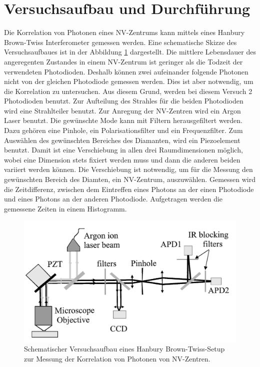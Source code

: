 \section{Versuchsaufbau und Durchf\"uhrung}
Die Korrelation von Photonen eines NV-Zentrums kann mittels eines  Hanbury Brown-Twiss Interferometer
gemessen werden. Eine schematische Skizze des Versuchsaufbaues ist in der Abbildung \ref{fig:Versuchsaufbau} dargestellt. 
Die mittlere Lebensdauer des angeregenten Zustandes in einem NV-Zentrum ist geringer als die Todzeit der verwendeten Photodioden. 
Deshalb k\"onnen zwei aufeinander folgende Photonen nicht von der gleichen Photodiode gemessen werden. 
Dies ist aber notwendig, um die Korrelation zu untersuchen. Aus diesem Grund, werden bei diesem Versuch 2 Photodioden benutzt. 
Zur Aufteilung des Strahles für die beiden Photodioden wird eine Strahlteiler benutzt. Zur Anregung der NV-Zentren wird ein Argon Laser benutzt. 
Die gewünschte Mode kann mit Filtern herausgefiltert werden. Dazu gehören eine Pinhole, ein Polarisationsfilter und ein Frequenzfilter.  
Zum Ausw\"ahlen des gew\"unschten Bereiches des Diamanten, wird ein Piezoelement benutzt. 
Damit ist eine Verschiebung in allen drei Raumdimensionen m\"oglich, wobei eine Dimension stets fixiert werden muss und dann die anderen beiden variiert werden k\"onnen. 
Die Verschiebung ist notwendig, um f\"ur die Messung den gew\"unschten Bereich des Diamten, ein NV-Zentrum, auszuw\"ahlen. Gemessen wird die Zeitdifferenz, zwischen dem Eintreffen eines Photons an der einen Photodiode und eines Photons an der anderen Photodiode. 
Aufgetragen werden die gemessene Zeiten in einem Histogramm.   
\begin{figure}[H]
\centering
\includegraphics[scale=0.5]{Versuchsaufbau.PNG}
\caption{Schematischer Versuchsaufbau eines Hanbury Brown-Twiss-Setup zur Messung der Korrelation von Photonen von NV-Zentren. \cite{brouri}  }
\label{fig:Versuchsaufbau}
\end{figure}
